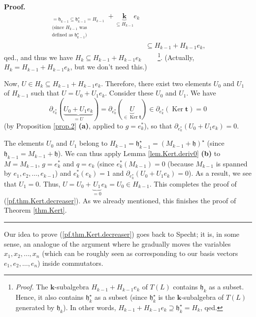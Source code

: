 \documentclass[numbers=enddot,12pt,final,onecolumn,notitlepage]{scrartcl}%
\theoremstyle{definition}
\newenvironment{proof}[1][Proof]{\noindent\textbf{#1.} }{\ \rule{0.5em}{0.5em}}
\begin{document}
\begin{proof}
{\begin{align*}
_{\substack{=\mathfrak{h}_{k-1}\subseteq\mathfrak{h}_{k-1}^{\star}%
=H_{k-1}\\\text{(since }H_{k-1}\text{ was}\\\text{defined as }\mathfrak{h}%
_{k-1}^{\star}\text{)}}}+\underbrace{\mathbf{k}}_{\subseteq H_{k-1}}e_{k}\\
&  \subseteq H_{k-1}+H_{k-1}e_{k},
\end{align*}
qed.}, and thus we have $H_{k}\subseteq H_{k-1}+H_{k-1}e_{k}$%
\ \ \ \ \footnote{\textit{Proof.} The $\mathbf{k}$-subalgebra $H_{k-1}%
+H_{k-1}e_{k}$ of $T\left(  L\right)  $ contains $\mathfrak{h}_{k}$ as a
subset. Hence, it also contains $\mathfrak{h}_{k}^{\star}$ as a subset (since
$\mathfrak{h}_{k}^{\star}$ is the $\mathbf{k}$-subalgebra of $T\left(
L\right)  $ generated by $\mathfrak{h}_{k}$). In other words, $H_{k-1}%
+H_{k-1}e_{k}\supseteq\mathfrak{h}_{k}^{\star}=H_{k}$, qed.}. (Actually,
$H_{k}=H_{k-1}+H_{k-1}e_{k}$, but we don't need this.)

Now, $U\in H_{k}\subseteq H_{k-1}+H_{k-1}e_{k}$. Therefore, there exist two
elements $U_{0}$ and $U_{1}$ of $H_{k-1}$ such that $U=U_{0}+U_{1}e_{k}$.
Consider these $U_{0}$ and $U_{1}$. We have%
\[
\partial_{e_{k}^{\ast}}\left(  \underbrace{U_{0}+U_{1}e_{k}}_{=U}\right)
=\partial_{e_{k}^{\ast}}\left(  \underbrace{U}_{\in\operatorname*{Ker}%
\mathbf{t}}\right)  \in\partial_{e_{k}^{\ast}}\left(  \operatorname*{Ker}%
\mathbf{t}\right)  =0
\]
(by Proposition \ref{prop.2} \textbf{(a)}, applied to $g=e_{k}^{\ast}$), so
that $\partial_{e_{k}^{\ast}}\left(  U_{0}+U_{1}e_{k}\right)  =0$.

The elements $U_{0}$ and $U_{1}$ belong to $H_{k-1}=\mathfrak{h}_{k-1}^{\star
}=\left(  M_{k-1}+\mathfrak{h}\right)  ^{\star}$ (since $\mathfrak{h}%
_{k-1}=M_{k-1}+\mathfrak{h}$). We can thus apply Lemma \ref{lem.Kert.deriv0}
\textbf{(b)} to $M=M_{k-1}$, $g=e_{k}^{\ast}$ and $q=e_{k}$ (since
$e_{k}^{\ast}\left(  M_{k-1}\right)  =0$ (because $M_{k-1}$ is spanned by
$e_{1},e_{2},\ldots,e_{k-1}$) and $e_{k}^{\ast}\left(  e_{k}\right)  =1$ and
$\partial_{e_{k}^{\ast}}\left(  U_{0}+U_{1}e_{k}\right)  =0$). As a result, we
see that $U_{1}=0$. Thus, $U=U_{0}+\underbrace{U_{1}}_{=0}e_{k}=U_{0}\in
H_{k-1}$. This completes the proof of (\ref{pf.thm.Kert.decreaser}). As we
already mentioned, this finishes the proof of Theorem \ref{thm.Kert}.
\end{proof}

Our idea to prove (\ref{pf.thm.Kert.decreaser}) goes back to Specht; it is, in
some sense, an analogue of the argument \cite[VI, Zweiter Schritt]{specht}
where he gradually moves the variables $x_{1},x_{2},\ldots,x_{n}$ (which can
be roughly seen as corresponding to our basis vectors $e_{1},e_{2}%
,\ldots,e_{n}$) inside commutators.
\end{document}
